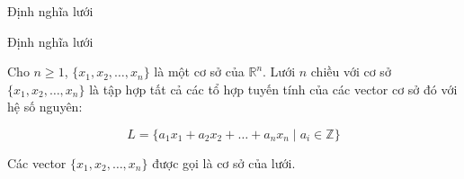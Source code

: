 \begin{frame}{Định nghĩa lưới}

\begin{block}{Định nghĩa lưới}

Cho \(n \geq 1 \), \(\{x_1, x_2, \ldots, x_n\}\) là một cơ sở của \(\mathbb{R}^n\).
Lưới \(n \) chiều với cơ sở \(\{x_1, x_2, \ldots, x_n\}\)
là tập hợp tất cả các tổ hợp tuyến tính của các vector cơ sở đó với hệ số nguyên:

$$
L = \{a_1 x_1 + a_2 x_2 + \ldots + a_n x_n \mid a_i \in \mathbb{Z} \}
$$

Các vector \(\{x_1, x_2, \ldots, x_n\}\) được gọi là cơ sở của lưới.

\end{block}

\end{frame}
